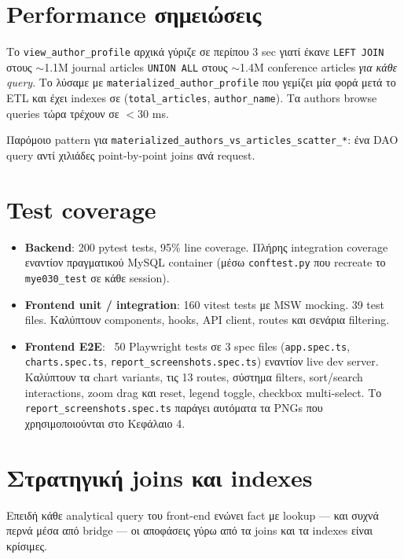 \section{Performance σημειώσεις}

Το \texttt{view\_author\_profile} αρχικά γύριζε σε περίπου 3 sec γιατί
έκανε \texttt{LEFT JOIN} στους \(\sim\)1.1M journal articles
\texttt{UNION ALL} στους \(\sim\)1.4M conference articles
\emph{για κάθε query}. Το λύσαμε με \texttt{materialized\_author\_profile}
που γεμίζει μία φορά μετά το ETL και έχει indexes σε
(\texttt{total\_articles}, \texttt{author\_name}). Τα authors browse
queries τώρα τρέχουν σε \(<\)30 ms.

Παρόμοιο pattern για \texttt{materialized\_authors\_vs\_articles\_scatter\_*}:
ένα DAO query αντί χιλιάδες point-by-point joins ανά request.

\section{Test coverage}

\begin{itemize}
    \item \textbf{Backend}: 200 pytest tests, 95\% line coverage. Πλήρης
          integration coverage εναντίον πραγματικού MySQL container
          (μέσω \texttt{conftest.py} που recreate το \texttt{mye030\_test}
          σε κάθε session).
    \item \textbf{Frontend unit / integration}: 160 vitest tests με
          MSW mocking. 39 test files. Καλύπτουν components, hooks,
          API client, routes και σενάρια filtering.
    \item \textbf{Frontend E2E}: ~50 Playwright tests σε 3 spec files
          (\texttt{app.spec.ts}, \texttt{charts.spec.ts},
          \texttt{report\_screenshots.spec.ts}) εναντίον live dev
          server. Καλύπτουν τα chart variants, τις 13 routes,
          σύστημα filters, sort/search interactions, zoom drag και reset,
          legend toggle, checkbox multi-select. Το
          \texttt{report\_screenshots.spec.ts} παράγει αυτόματα τα PNGs
          που χρησιμοποιούνται στο Κεφάλαιο 4.
\end{itemize}

\section{Στρατηγική joins και indexes}

Επειδή κάθε analytical query του front-end ενώνει fact με lookup ---
και συχνά περνά μέσα από bridge --- οι αποφάσεις γύρω από τα joins
και τα indexes είναι κρίσιμες.

